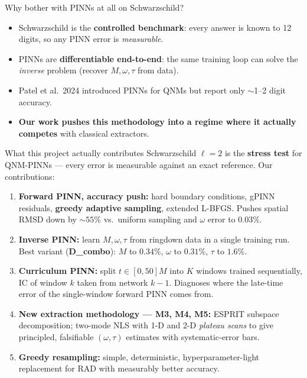 \documentclass[aspectratio=169, 11pt]{beamer}
\newcommand{\qnms}{QNMs}
\begin{document}
\begin{frame}{Why bother with PINNs at all on Schwarzschild?}
  \begin{itemize}
    \item Schwarzschild is the \textbf{controlled benchmark}: every answer
          is known to 12 digits, so any PINN error is \emph{measurable}.
    \item PINNs are \textbf{differentiable end-to-end}: the same training
          loop can solve the \emph{inverse} problem (recover $M, \omega, \tau$
          from data).
    \item Patel et al.\ 2024 introduced PINNs for \qnms{} but report only
          $\sim$1--2 digit accuracy.
    \item \textbf{Our work pushes this methodology into a regime where it
          actually competes} with classical extractors.
  \end{itemize}
\end{frame}

\begin{frame}{What this project actually contributes}
  Schwarzschild $\ell\!=\!2$ is the \textbf{stress test} for QNM-PINNs ---
  every error is measurable against an exact reference. Our contributions:
  \medskip
  \begin{enumerate}
    \item \textbf{Forward PINN, accuracy push:} hard boundary conditions,
          gPINN residuals, \textbf{greedy adaptive sampling},
          extended L-BFGS. Pushes spatial RMSD down by $\sim$$55\%$ vs.\
          uniform sampling and $\omega$ error to $0.03\%$.
    \medskip
    \item \textbf{Inverse PINN:} learn $M,\omega,\tau$ from ringdown data
          in a single training run. Best variant (\textbf{D\_combo}): $M$ to $0.34\%$,
          $\omega$ to $0.31\%$, $\tau$ to $1.6\%$.
    \medskip
    \item \textbf{Curriculum PINN:} split $t\!\in\![0,50]M$ into
          $K$ windows trained sequentially, IC of window $k$ taken
          from network $k\!-\!1$. Diagnoses where the late-time
          error of the single-window forward PINN comes from.
    \medskip
    \item \textbf{New extraction methodology --- M3, M4, M5:}
          ESPRIT subspace decomposition; two-mode NLS with 1-D and 2-D
          \emph{plateau scans} to give principled, falsifiable
          $(\omega, \tau)$ estimates with systematic-error bars.
    \medskip
    \item \textbf{Greedy resampling:} simple, deterministic, hyperparameter-light
          replacement for RAD with measurably better accuracy.
  \end{enumerate}
\end{frame}
\end{document}
